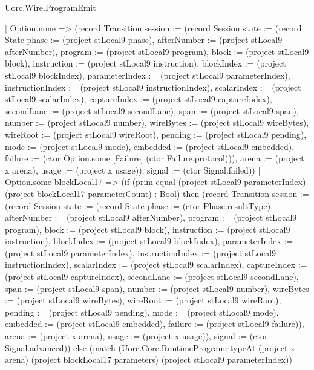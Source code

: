 \begin{lexlean}{Uorc.Wire.ProgramEmit}
\begin{semanticmodule}
{          | Option.none => (record Transition {session := (record Session {state := (record State {phase := (project stLocal9 phase), afterNumber := (project stLocal9 afterNumber), program := (project stLocal9 program), block := (project stLocal9 block), instruction := (project stLocal9 instruction), blockIndex := (project stLocal9 blockIndex), parameterIndex := (project stLocal9 parameterIndex), instructionIndex := (project stLocal9 instructionIndex), scalarIndex := (project stLocal9 scalarIndex), captureIndex := (project stLocal9 captureIndex), secondLane := (project stLocal9 secondLane), span := (project stLocal9 span), number := (project stLocal9 number), wireBytes := (project stLocal9 wireBytes), wireRoot := (project stLocal9 wireRoot), pending := (project stLocal9 pending), mode := (project stLocal9 mode), embedded := (project stLocal9 embedded), failure := (ctor Option.some [Failure] (ctor Failure.protocol))}), arena := (project x arena), usage := (project x usage)}), signal := (ctor Signal.failed)})
          | Option.some blockLocal17 => (if (prim equal (project stLocal9 parameterIndex) (project blockLocal17 parameterCount) : Bool) then (record Transition {session := (record Session {state := (record State {phase := (ctor Phase.resultType), afterNumber := (project stLocal9 afterNumber), program := (project stLocal9 program), block := (project stLocal9 block), instruction := (project stLocal9 instruction), blockIndex := (project stLocal9 blockIndex), parameterIndex := (project stLocal9 parameterIndex), instructionIndex := (project stLocal9 instructionIndex), scalarIndex := (project stLocal9 scalarIndex), captureIndex := (project stLocal9 captureIndex), secondLane := (project stLocal9 secondLane), span := (project stLocal9 span), number := (project stLocal9 number), wireBytes := (project stLocal9 wireBytes), wireRoot := (project stLocal9 wireRoot), pending := (project stLocal9 pending), mode := (project stLocal9 mode), embedded := (project stLocal9 embedded), failure := (project stLocal9 failure)}), arena := (project x arena), usage := (project x usage)}), signal := (ctor Signal.advanced)}) else (match (Uorc.Core.RuntimeProgram::typeAt (project x arena) (project blockLocal17 parameters) (project stLocal9 parameterIndex))
}
\end{semanticmodule}
\end{lexlean}
